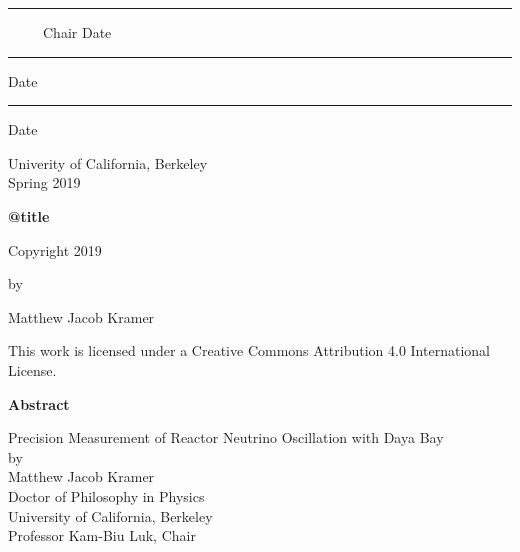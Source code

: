 \documentclass[11pt,oneside]{memoir}
\def\mylarge{\large}            %
\begin{document}
{\begin{minipage}{0.85\linewidth}
\begin{center}
    \vspace{3.5\baselineskip}
    \hrule\vspace{0.25\baselineskip}
    {\small\ \ \ \ \ Chair \hfill Date}
    \vspace{3\baselineskip}
    \hrule\vspace{0.25\baselineskip}
    {\small\hfill Date}
    \vspace{3\baselineskip}
    \hrule\vspace{0.25\baselineskip}
    {\small\hfill Date}
    \vspace{2.5\baselineskip}   %

    Univerity of California, Berkeley\\
    \vspace{1.5\baselineskip}
    Spring 2019
  \end{center}
\end{minipage}

\clearpage
\thispagestyle{empty}

\begin{center}
  \SingleSpacing
  \textbf{\csname @title\endcsname}

  \vspace{5\baselineskip}
  Copyright 2019
  \par\vspace{\baselineskip} by
  \par\vspace{\baselineskip} Matthew Jacob Kramer

  \vspace{5\baselineskip} This work is licensed under a Creative Commons Attribution 4.0 International License.
\end{center}

\clearpage
} %

\pagestyle{empty}
\DoubleSpacing

\begin{center}
  \mylarge
  \textbf{Abstract}

  \vspace{1.5\baselineskip}
  Precision Measurement of Reactor Neutrino Oscillation with Daya Bay\\
  \vspace{\baselineskip} by\\
  \vspace{\baselineskip} Matthew Jacob Kramer\\
  Doctor of Philosophy in Physics\\
  University of California, Berkeley\\
  Professor Kam-Biu Luk, Chair
  \vspace{\baselineskip}
\end{center}
\end{document}
